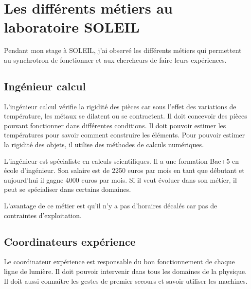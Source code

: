 
\chapter{Les différents métiers au laboratoire SOLEIL}
	\minitoc
	




			
	

		Pendant mon stage à SOLEIL, j'ai observé les différents métiers qui permettent au synchrotron de fonctionner et aux chercheurs de faire leurs expériences.			

		\section{Ingénieur calcul}
			L'ingénieur calcul vérifie la rigidité des pièces car sous l'effet des variations de température, les métaux se dilatent ou se contractent. Il doit concevoir des pièces pouvant fonctionner dans différentes conditions. Il doit pouvoir estimer les températures pour savoir comment construire les éléments. Pour pouvoir estimer la rigidité des objets, il utilise des méthodes de calculs numériques.
			
			L'ingénieur est spécialiste en calculs scientifiques. Il a une formation Bac+5 en école d'ingénieur. Son salaire est de 2250 euros par mois en tant que débutant et aujourd'hui il gagne 4000 euros par mois. Si il veut évoluer dans son métier, il peut se spécialiser dans certains domaines.
			
			L'avantage de ce métier est qu'il n'y a pas d'horaires décalés car pas de contraintes d'exploitation.  
		
		\section{Coordinateurs expérience}
			Le coordinateur expérience est responsable du bon fonctionnement de chaque ligne de lumière. Il doit pouvoir intervenir dans tous les domaines de la physique. Il doit aussi connaître les gestes de premier secours et savoir utiliser les machines.
			
